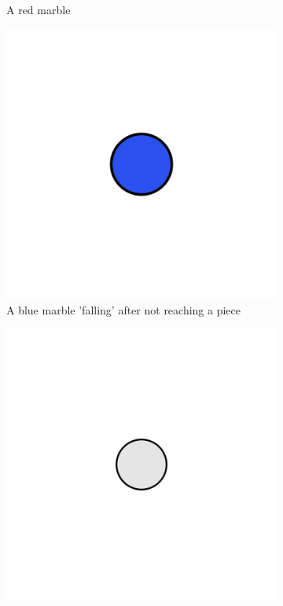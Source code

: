 \documentclass{l4proj}
\begin{document}
\begin{figure}
\begin{subfigure}[b]{0.3\textwidth}
        \caption{A red marble}
        \label{fig:redMarble}
    \end{subfigure}
    \begin{subfigure}[b]{0.3\textwidth}
        \includegraphics[width=1\textwidth]{images/blue-marble-fall.png}
        \caption{A blue marble 'falling' after not reaching a piece}
        \label{fig:marbleFall}
    \end{subfigure}
    \begin{subfigure}[b]{0.3\textwidth}
        \includegraphics[width=1\textwidth]{images/pin.png}

\end{subfigure}
\end{figure}
\end{document}
